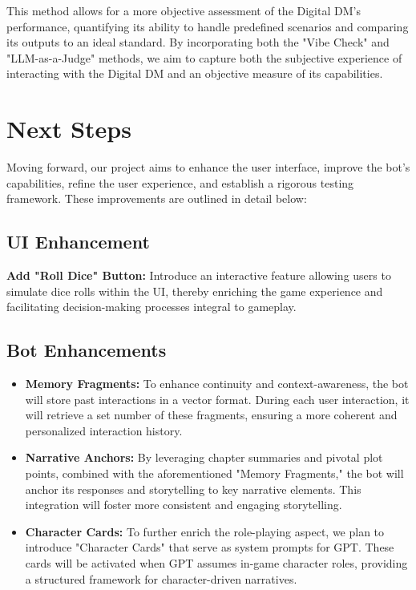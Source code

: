 \documentclass[letterpaper]{article}
\begin{document}
This method allows for a more objective assessment of the Digital DM's performance, quantifying its ability to handle predefined scenarios and comparing its outputs to an ideal standard. By incorporating both the "Vibe Check" and "LLM-as-a-Judge" methods, we aim to capture both the subjective experience of interacting with the Digital DM and an objective measure of its capabilities.

\section{Next Steps}
Moving forward, our project aims to enhance the user interface, improve the bot's capabilities, refine the user experience, and establish a rigorous testing framework. These improvements are outlined in detail below:

\subsection{UI Enhancement}
\textbf{Add "Roll Dice" Button:} Introduce an interactive feature allowing users to simulate dice rolls within the UI, thereby enriching the game experience and facilitating decision-making processes integral to gameplay.

\subsection{Bot Enhancements}
\begin{itemize}
\item \textbf{Memory Fragments:} To enhance continuity and context-awareness, the bot will store past interactions in a vector format. During each user interaction, it will retrieve a set number of these fragments, ensuring a more coherent and personalized interaction history.
\item \textbf{Narrative Anchors:} By leveraging chapter summaries and pivotal plot points, combined with the aforementioned "Memory Fragments," the bot will anchor its responses and storytelling to key narrative elements. This integration will foster more consistent and engaging storytelling.
\item \textbf{Character Cards:} To further enrich the role-playing aspect, we plan to introduce "Character Cards" that serve as system prompts for GPT. These cards will be activated when GPT assumes in-game character roles, providing a structured framework for character-driven narratives.
\end{itemize}
\end{document}
